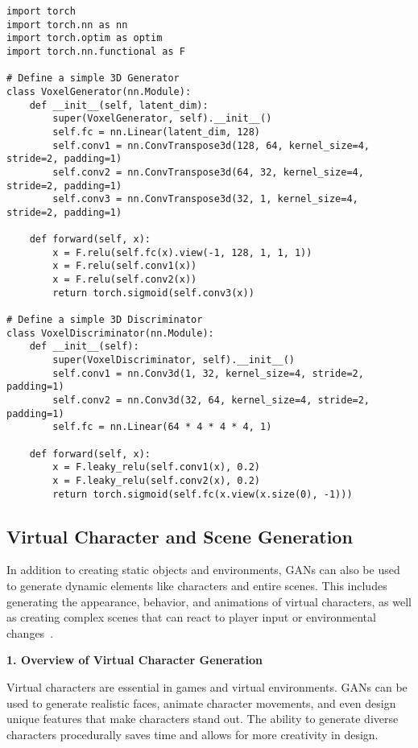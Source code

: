 \begin{lstlisting}[style=python]
import torch
import torch.nn as nn
import torch.optim as optim
import torch.nn.functional as F

# Define a simple 3D Generator
class VoxelGenerator(nn.Module):
    def __init__(self, latent_dim):
        super(VoxelGenerator, self).__init__()
        self.fc = nn.Linear(latent_dim, 128)
        self.conv1 = nn.ConvTranspose3d(128, 64, kernel_size=4, stride=2, padding=1)
        self.conv2 = nn.ConvTranspose3d(64, 32, kernel_size=4, stride=2, padding=1)
        self.conv3 = nn.ConvTranspose3d(32, 1, kernel_size=4, stride=2, padding=1)
    
    def forward(self, x):
        x = F.relu(self.fc(x).view(-1, 128, 1, 1, 1))
        x = F.relu(self.conv1(x))
        x = F.relu(self.conv2(x))
        return torch.sigmoid(self.conv3(x))

# Define a simple 3D Discriminator
class VoxelDiscriminator(nn.Module):
    def __init__(self):
        super(VoxelDiscriminator, self).__init__()
        self.conv1 = nn.Conv3d(1, 32, kernel_size=4, stride=2, padding=1)
        self.conv2 = nn.Conv3d(32, 64, kernel_size=4, stride=2, padding=1)
        self.fc = nn.Linear(64 * 4 * 4 * 4, 1)
    
    def forward(self, x):
        x = F.leaky_relu(self.conv1(x), 0.2)
        x = F.leaky_relu(self.conv2(x), 0.2)
        return torch.sigmoid(self.fc(x.view(x.size(0), -1)))
\end{lstlisting}

\subsection{Virtual Character and Scene Generation}

In addition to creating static objects and environments, GANs can also be used to generate dynamic elements like characters and entire scenes. This includes generating the appearance, behavior, and animations of virtual characters, as well as creating complex scenes that can react to player input or environmental changes~\cite{xu2021gan}.

\textbf{1. Overview of Virtual Character Generation}

Virtual characters are essential in games and virtual environments. GANs can be used to generate realistic faces, animate character movements, and even design unique features that make characters stand out. The ability to generate diverse characters procedurally saves time and allows for more creativity in design.

